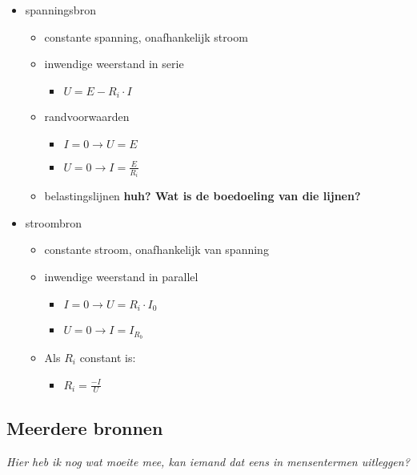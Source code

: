 \documentclass[11pt]{article}
\let\originalitem\item
\renewcommand{\item}{\originalitem[]}
\newcommand{\Newpage}{\end{preview}\begin{preview}}
\begin{document}
\begin{preview}
\begin{itemize}
\item spanningsbron
	\begin{itemize}
		\item constante spanning, onafhankelijk stroom
		\item inwendige weerstand in serie
			\begin{itemize}
				\item $U = E - R_i \cdot I$
			\end{itemize}
		\item randvoorwaarden
		\begin{itemize}
			\item $I = 0 \rightarrow U = E$
			\item $U = 0 \rightarrow I = \frac{E}{R_i}$
		\end{itemize}
		\item belastingslijnen \textbf{huh? Wat is de boedoeling van die lijnen?}
	\end{itemize}
\item stroombron
	\begin{itemize}
		\item constante stroom, onafhankelijk van spanning
		\item inwendige weerstand in parallel
		\begin{itemize}
			\item $I = 0 \rightarrow U = R_i \cdot I_0$
			\item $U = 0 \rightarrow I = I_{R_b}$
		\end{itemize}
		\item Als $R_i$ constant is:
		\begin{itemize}
			\item $R_i = \frac{-I}{U}$
		\end{itemize}
	\end{itemize}
\end{itemize}

\Newpage
\section{Meerdere bronnen}

\textit{Hier heb ik nog wat moeite mee, kan iemand dat eens in mensentermen uitleggen?}


\end{preview}
\end{document}
